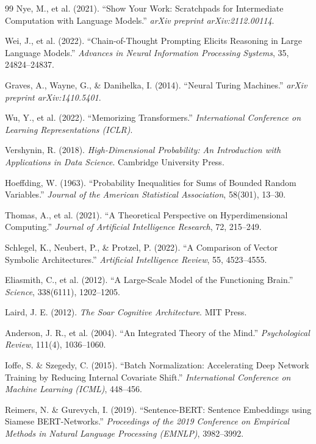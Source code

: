 \documentclass[a4paper,11pt]{article}
\begin{document}
\begin{thebibliography}{99}
Nye, M., et al. (2021).
``Show Your Work: Scratchpads for Intermediate Computation with Language Models.''
\textit{arXiv preprint arXiv:2112.00114}.

Wei, J., et al. (2022).
``Chain-of-Thought Prompting Elicits Reasoning in Large Language Models.''
\textit{Advances in Neural Information Processing Systems}, 35, 24824--24837.

Graves, A., Wayne, G., \& Danihelka, I. (2014).
``Neural Turing Machines.''
\textit{arXiv preprint arXiv:1410.5401}.

Wu, Y., et al. (2022).
``Memorizing Transformers.''
\textit{International Conference on Learning Representations (ICLR)}.

Vershynin, R. (2018).
\textit{High-Dimensional Probability: An Introduction with Applications in Data Science}.
Cambridge University Press.

Hoeffding, W. (1963).
``Probability Inequalities for Sums of Bounded Random Variables.''
\textit{Journal of the American Statistical Association}, 58(301), 13--30.

Thomas, A., et al. (2021).
``A Theoretical Perspective on Hyperdimensional Computing.''
\textit{Journal of Artificial Intelligence Research}, 72, 215--249.

Schlegel, K., Neubert, P., \& Protzel, P. (2022).
``A Comparison of Vector Symbolic Architectures.''
\textit{Artificial Intelligence Review}, 55, 4523--4555.

Eliasmith, C., et al. (2012).
``A Large-Scale Model of the Functioning Brain.''
\textit{Science}, 338(6111), 1202--1205.

Laird, J. E. (2012).
\textit{The Soar Cognitive Architecture}.
MIT Press.

Anderson, J. R., et al. (2004).
``An Integrated Theory of the Mind.''
\textit{Psychological Review}, 111(4), 1036--1060.

Ioffe, S. \& Szegedy, C. (2015).
``Batch Normalization: Accelerating Deep Network Training by Reducing Internal Covariate Shift.''
\textit{International Conference on Machine Learning (ICML)}, 448--456.


Reimers, N. \& Gurevych, I. (2019).
``Sentence-BERT: Sentence Embeddings using Siamese BERT-Networks.''
\textit{Proceedings of the 2019 Conference on Empirical Methods in Natural Language Processing (EMNLP)}, 3982--3992.


\end{thebibliography}
\end{document}
